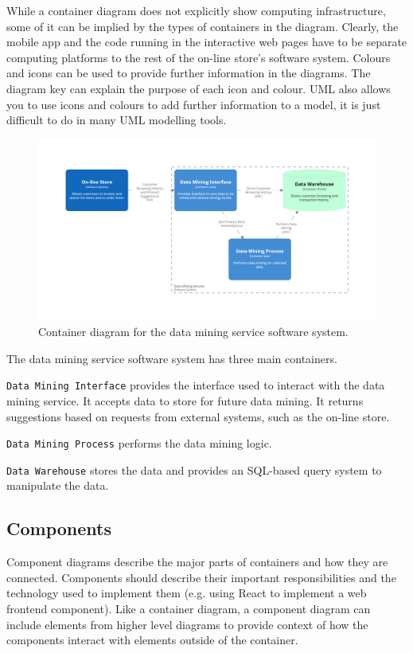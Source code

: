 \noindent
While a container diagram does not explicitly show computing infrastructure, some of it can be implied by the types of containers in the diagram.
Clearly, the mobile app and the code running in the interactive web pages have to be separate computing platforms to the rest of the on-line store's software system.
Colours and icons can be used to provide further information in the diagrams.
The diagram key can explain the purpose of each icon and colour.
UML also allows you to use icons and colours to add further information to a model, it is just difficult to do in many UML modelling tools.

\begin{figure}[h]
    \centering
    \includegraphics[trim=185 185 185 185,clip,width=\textwidth]{images/c4/datamining_container_diagram.png}
    \caption{Container diagram for the data mining service software system.}
    \label{fig:c4_container_datamining}
\end{figure}

\noindent
The data mining service software system has three main containers.

\texttt{Data Mining Interface} provides the interface used to interact with the data mining service.
It accepts data to store for future data mining.
It returns suggestions based on requests from external systems, such as the on-line store.

\texttt{Data Mining Process} performs the data mining logic.

\texttt{Data Warehouse} stores the data and provides an SQL-based query system to manipulate the data.

\subsection{Components}
Component diagrams describe the major parts of containers and how they are connected.
Components should describe their important responsibilities and the technology used to implement them
(e.g. using React to implement a web frontend component).
Like a container diagram, a component diagram can include elements from higher level diagrams
to provide context of how the components interact with elements outside of the container.

